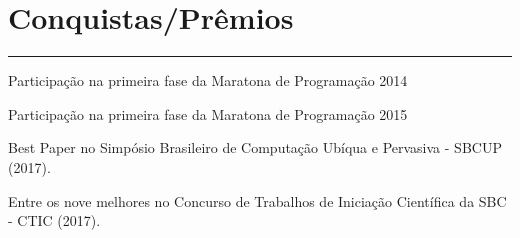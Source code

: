 \documentclass[]{rahulworld-resume}
\begin{document}
\begin{minipage}[t]{0.66\textwidth}
\section{Conquistas/Prêmios} 
\noindent\rule{12.5cm}{0.4pt}
 
\noindent
\hspace{5em}%
\begin{minipage}{0.85\textwidth\vspace{2pt}}
Participação na primeira fase da Maratona de Programação 2014
\end{minipage}
 
\noindent
\hspace{5em}%
\begin{minipage}{0.85\textwidth\vspace{2pt}}
Participação na primeira fase da Maratona de Programação 2015
\end{minipage}
 
\noindent
\hspace{5em}%
\begin{minipage}{0.85\textwidth\vspace{2pt}}
Best Paper no Simpósio Brasileiro de Computação Ubíqua e Pervasiva - SBCUP (2017).
\end{minipage}
 
\noindent
\hspace{5em}%
\begin{minipage}{0.85\textwidth\vspace{2pt}}
Entre os nove melhores no Concurso de Trabalhos de Iniciação Científica da SBC - CTIC (2017).
\end{minipage}

\end{minipage}
\end{document}
